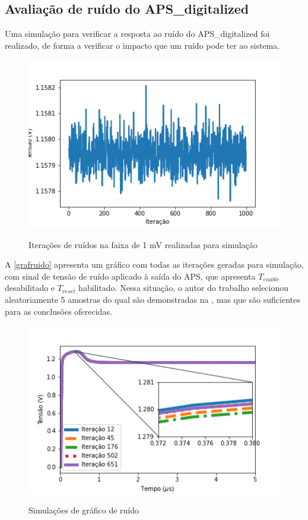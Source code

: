 \subsection{Avaliação de ruído do APS\_digitalized}

Uma simulação para verificar a resposta ao ruído do APS\_digitalized foi realizado, de forma a verificar o impacto que um ruído pode ter ao sistema.

\begin{figure}[!h]
 \centering
    \caption{Iterações de ruídos na faixa de 1 mV realizadas para simulação} 
    \includegraphics[scale=0.6]{Resultados/Graficos/ruido-Vout_noise.png}
    \label{grafruido}
\end{figure}

A \autoref{grafruido} apresenta um gráfico com todas as iterações geradas para simulação, com sinal de tensão de ruído aplicado à saída do APS, que apresenta $T_{enable}$ desabilitado e $T_{reset}$ habilitado. Nessa situação, o autor do trabalho selecionou aleatoriamente 5 amostras do qual são demonstradas na , mas que são suficientes para as conclusões oferecidas.

\begin{figure}[!h]
 \centering
    \caption{Simulações de gráfico de ruído} 
    \includegraphics[scale=0.8]{Resultados/Graficos/tb_pixel_TRAN_NOISE.png}
    \label{grafruido2}
\end{figure}

